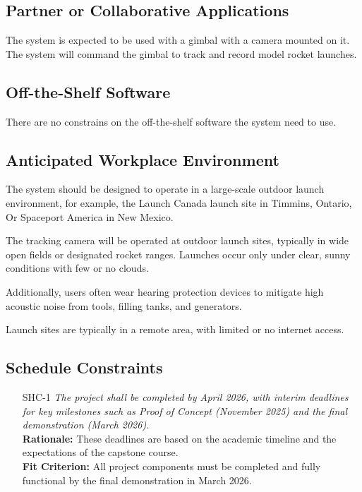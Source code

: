 \documentclass[12pt]{article}
\begin{document}
\subsection{Partner or Collaborative Applications}

The system is expected to be used with a gimbal with a camera mounted on it.
The system will command the gimbal to track and record model rocket launches.

\subsection{Off-the-Shelf Software}

There are no constrains on the off-the-shelf software the system need to use.

\subsection{Anticipated Workplace Environment}

The system should be designed to operate in a large-scale outdoor launch
environment, for example, the Launch Canada launch site in Timmins, Ontario, Or
Spaceport America in New Mexico.

The tracking camera will be operated at outdoor launch sites, typically in wide
open fields or designated rocket ranges. Launches occur only under clear, sunny
conditions with few or no clouds.

Additionally, users often wear hearing protection devices to mitigate high
acoustic noise from tools, filling tanks, and generators.

Launch sites are typically in a remote area, with limited or no internet
access.

\subsection{Schedule Constraints}

\begin{itemize}[leftmargin=*]
  \item[SHC-1] \emph{The project shall be completed by April 2026, with interim
          deadlines for key milestones such as Proof of Concept (November 2025) and the
          final demonstration (March 2026).}\\[2mm]
        \textbf{Rationale:} These deadlines are based on the academic timeline and the expectations of the capstone course.\\
        \textbf{Fit Criterion:} All project components must be completed and fully functional by the final demonstration in March 2026.
\end{itemize}
\end{document}
